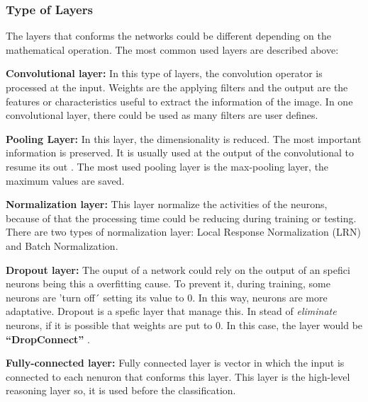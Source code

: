 \subsubsection{Type of Layers}
The layers that conforms the networks could be different depending on the mathematical operation. The most common used layers are described above:
\begin{description}[noitemsep,topsep=8pt,parsep=0pt,partopsep=20pt]
	\item \textbf{Convolutional layer:} In this type of layers, the convolution operator is processed at the input. Weights are the applying filters and the output are the features or characteristics useful to extract the information of the image. In one convolutional layer, there could be used as many filters are user defines.
	\item \textbf{Pooling Layer:} In this layer, the dimensionality is reduced. The most important information is preserved. It is usually used at the output of the convolutional to resume its out \cite{Doorn}. The most used pooling layer is the max-pooling layer, the maximum values are saved.
	\item \textbf{Normalization layer:} This layer normalize the activities of the neurons, because of that the processing time could be reducing during training or testing. There are two types of normalization layer: Local Response Normalization (LRN) and Batch Normalization.
	\item \textbf{Dropout layer:} The ouput of a network could rely on the output of an spefici neurons being this a overfitting cause. To prevent it, during training, some neurons are 'turn off´ setting its value to 0. In this way, neurons are more adaptative. Dropout is a spefic layer that manage this. In stead of \textit{eliminate} neurons, if it is possible that weights are put to 0. In this case, the layer would be \textbf{``DropConnect''} \cite{Doorn}.
	\item  \textbf{Fully-connected layer:} Fully connected layer is vector in which the input is connected to each nenuron that conforms this layer. This layer is the high-level reasoning layer so, it is used before the classification.  
\end{description}

